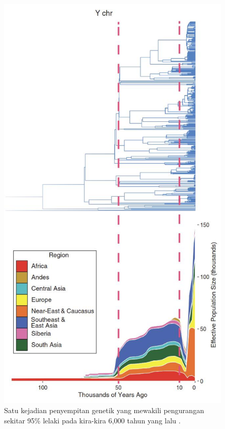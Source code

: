 \documentclass[10pt,twocolumn,letterpaper]{article}
\begin{document}
\begin{figure}[b]

\begin{center}
   \includegraphics[width=1\linewidth]{bottleneck.jpg}
\end{center}
   \caption{Satu kejadian penyempitan genetik yang mewakili pengurangan sekitar 95\% lelaki pada kira-kira 6,000 tahun yang lalu \cite{62}.}
\label{fig:10}
\label{fig:onecol}
\end{figure}
\end{document}
